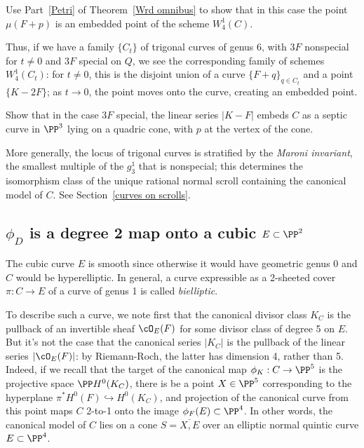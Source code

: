 \begin{exercise}
Use Part~\ref{Petri} of Theorem~\ref{Wrd omnibus} to show that in this case the point $\mu(F+p)$ is an embedded point of the scheme $W^1_4(C)$.
\end{exercise} 

Thus, if we have a family $\{C_t\}$ of trigonal curves of genus 6, with $3F$ nonspecial for $t \neq 0$ and $3F$ special on $Q$, we see the corresponding family of schemes $W^1_4(C_t)$: for $t \neq 0$, this is the disjoint union of a curve $\{F+q\}_{q \in C_t}$ and a point $\{K-2F\}$; as $t \to 0$, the point moves onto the curve, creating an embedded point.

\begin{exercise}
Show that in the case $3F$ special, the linear series $|K-F|$ embeds $C$ as a septic curve in $\PP^3$ lying on a quadric cone, with $p$ at the vertex of the cone.
\end{exercise}

More generally, the locus of trigonal curves is stratified by  the \emph{Maroni invariant}, the smallest multiple  of the $g^1_3$ that is nonspecial; this determines the isomorphism class of the unique rational normal scroll containing the canonical model of $C$. See Section~\ref{curves on scrolls}. 

\subsection{$\phi_{D} $ is a degree 2 map onto a cubic $E\subset \PP^{2}$}

The cubic curve $E$ is smooth since otherwise it would have geometric genus 0 and $C$ would be  hyperelliptic. In general, a curve expressible as a 2-sheeted cover $\pi : C \to E$ of a curve of genus 1 is called \emph{bielliptic}.

To describe such a curve, we note first that the canonical divisor class $K_C$ is the pullback of an invertible sheaf $\cO_E(F)$ for some divisor class of degree 5 on $E$. But it's not the case that the canonical series $|K_C|$ is the pullback of the linear series $|\cO_E(F)|$: by Riemann-Roch, the latter has dimension 4, rather than 5. Indeed, if we recall that the target of the canonical map $\phi_K : C \to \PP^5$ is the projective space $\PP H^0(K_C)$, there is be a point $X \in \PP^5$ corresponding to the hyperplane $\pi^*H^0(F) \hookrightarrow H^0(K_C)$, and projection of the canonical curve from this point maps $C$ 2-to-1 onto the image $\phi_F(E) \subset \PP^4$. In other words, the canonical model of $C$ lies on a cone $S = \overline{X, E}$ over an elliptic normal quintic curve $E \subset \PP^4$.

